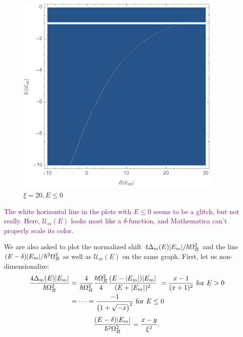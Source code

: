 \documentclass{article}
\theoremstyle{definition}
\newcommand{\f}[2]{\frac{#1}{#2}}
\newcommand{\lp}{\left(}
\newcommand{\rp}{\right)}
\begin{document}
\begin{enumerate}[label=(\alph*)]
\begin{figure}[!htb]
\begin{minipage}{0.3\textwidth}
\caption{$\xi = 8, E \leq 0$}
\end{minipage}
\begin{minipage}{0.3\textwidth}
\includegraphics[width=0.9\textwidth]{UmE_density_plot_20_neg.png}
\caption{$\xi = 20, E \leq 0 $}
\end{minipage}
\end{figure}

\textcolor{purple}{The white horizontal line in the plots with $E\leq 0$ seems to be a glitch, but not really. Here, $\mathcal{U}_m(E)$ looks most like a $\delta$-function, and Mathematica can't properly scale its color.}

We are also asked to plot the normalized shift $4\Delta_m(E) \abs{E_m} / \hbar \Omega_R^2$ and the line $(E - \delta) \abs{E_m} / \hbar^2 \Omega_R^2$ as well as $\mathcal{U}_m(E)$ on the same graph. First, let us non-dimensionalize: 
\begin{align*}
\f{4\Delta_m(E) \abs{E_m}}{\hbar \Omega_R^2} 
&= \f{4}{\hbar \Omega_R^2} \f{\hbar \Omega_R^2}{4} \f{(E - \abs{E_m}) \abs{E_m} }{(E + \abs{E_m})^2} \ = \f{x - 1}{ (x+1)^2 } \text{ for } E  > 0 \\ 
&= \dots = \f{-1}{\lp 1 + \sqrt{-x} \rp^2} \text{ for } E \leq 0
\end{align*}
\begin{align*}
\f{(E - \delta)\abs{E_m}}{\hbar^2\Omega^2_R} = \f{x-y}{\xi^2}. 
\end{align*}



\end{enumerate}
\end{document}
